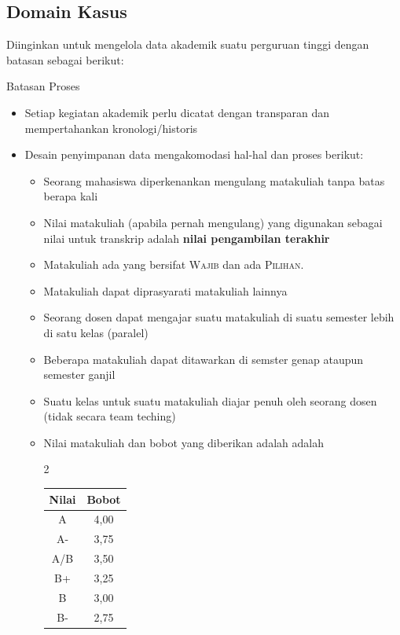 \subsection{Domain Kasus}
Diinginkan untuk mengelola data akademik suatu perguruan tinggi dengan batasan sebagai berikut:
\begin{infobox}{Batasan Proses}
    \begin{itemize}
        \itemsep0em
     \item Setiap kegiatan akademik perlu dicatat dengan transparan dan mempertahankan kronologi/historis
     \item Desain penyimpanan data mengakomodasi hal-hal dan proses berikut:
     \begin{itemize}
         \itemsep0em \small
         \item Seorang mahasiswa diperkenankan mengulang matakuliah tanpa batas berapa kali
         \item Nilai matakuliah (apabila pernah mengulang) yang digunakan sebagai nilai untuk transkrip adalah \textbf{nilai pengambilan terakhir}
         \item Matakuliah ada yang bersifat \textsc{Wajib} dan ada \textsc{Pilihan}.
         \item Matakuliah dapat diprasyarati matakuliah lainnya
          \item Seorang dosen dapat mengajar suatu matakuliah di suatu semester lebih di satu kelas (paralel)
         \item Beberapa matakuliah dapat ditawarkan di semster genap ataupun semester ganjil
         \item Suatu kelas untuk suatu matakuliah diajar penuh oleh seorang dosen (tidak secara team teching)
         \item Nilai matakuliah dan bobot yang diberikan adalah adalah 
         \begin{center}
         \begin{multicols}{2}
            \begin{tabular}{c|c}
             Nilai & Bobot \\ \hline
           A   & 4,00 \\
            A-  & 3,75 \\
            A/B & 3,50 \\
            B+ & 3,25 \\
            B & 3,00 \\ 
            B-  & 2,75 \\
         \end{tabular}  

\end{multicols}
\end{center}
\end{itemize}
\end{itemize}
\end{infobox}
